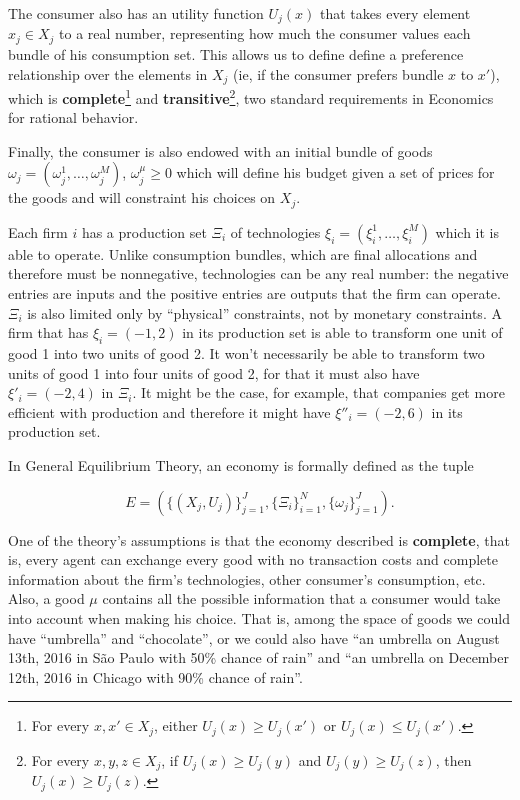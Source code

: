 The consumer also has an utility function $U_j(x)$ that takes every element $x_j \in X_j$ to a real number, representing how much the
consumer values each bundle of his consumption set. This allows us to define define a preference relationship over the elements in $X_j$
(ie, if the consumer prefers bundle $x$ to $x'$), which is \textbf{complete}\footnote{For every $x, x' \in X_j$, either
  $U_j(x) \geq U_j(x')$ or $U_j(x) \leq U_j(x')$.} and \textbf{transitive}\footnote{For every $x, y, z \in X_j$, if
  $U_j(x) \geq U_j(y)$ and $U_j(y) \geq U_j(z)$, then $U_j(x) \geq U_j(z)$.}, two standard requirements in Economics for
rational behavior.

Finally, the consumer is also endowed with an initial bundle of goods $\omega_j = (\omega_j^1, \ldots, \omega_j^M)$, $\omega_j^\mu \geq 0$
which will define his budget given a set of prices for the goods and will constraint his choices on $X_j$.

Each firm $i$ has a production set $\Xi_i$ of technologies $\xi_i = (\xi_i^1, \ldots, \xi_i^M)$ which it is able to operate. Unlike
consumption bundles, which are final allocations and therefore must be nonnegative, technologies can be any real number: the negative entries
are inputs and the positive entries are outputs that the firm can operate. $\Xi_i$ is also limited only by ``physical'' constraints, not
by monetary constraints. A firm that has $\xi_i = (-1, 2)$ in its production set is able to transform one unit of good 1 into two units
of good 2. It won't necessarily be able to transform two units of good 1 into four units of good 2, for that it must also have $\xi'_i = (-2,
4)$ in $\Xi_i$. It might be the case, for example, that companies get more efficient with production and therefore it might have $\xi''_i = (-2, 6)$ in its production set.

In General Equilibrium Theory, an economy is formally defined as the tuple

\begin{equation}
  E = \left(\{(X_j,U_j)\}_{j=1}^J,
    \{\Xi_i\}_{i=1}^N, \{\omega_j\}_{j=1}^J \right).\label{eq:econGE}
\end{equation}

One of the theory's assumptions is that the economy described is \textbf{complete}, that is, every agent can exchange every good with no transaction costs and complete information about the firm's technologies, other consumer's consumption, etc. Also, a good $\mu$ contains all the possible information that a consumer would take into account when making his choice. That is, among the space of goods we could have ``umbrella'' and ``chocolate'', or we could also have ``an umbrella on August 13th, 2016 in São Paulo with 50\% chance of rain'' and ``an umbrella on December 12th, 2016 in Chicago with 90\% chance of rain''. 

